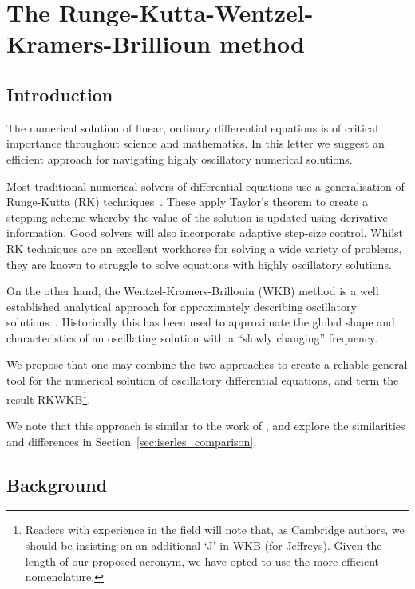 

\chapter{The Runge-Kutta-Wentzel-Kramers-Brillioun method}
\label{chap:RK}

\section{Introduction}
\label{sec:introduction}
The numerical solution of linear, ordinary differential equations is of critical importance throughout science and mathematics. In this letter we suggest an efficient approach for navigating highly oscillatory numerical solutions.

Most traditional numerical solvers of differential equations use a generalisation of Runge-Kutta (RK) techniques~\citep{Press+2007}. These apply Taylor's theorem to create a stepping scheme whereby the value of the solution is updated using derivative information. Good solvers will also incorporate adaptive step-size control.
Whilst RK techniques are an excellent workhorse for solving a wide variety of problems, they are known to struggle to solve equations with highly oscillatory solutions.

On the other hand, the Wentzel-Kramers-Brillouin (WKB) method is a well established analytical approach for approximately describing oscillatory solutions~\citep{RHB,Bender+2010}. Historically this has been used to approximate the global shape and characteristics of an oscillating solution with a ``slowly changing'' frequency.

We propose that one may combine the two approaches to create a reliable general tool for the numerical solution of oscillatory differential equations, and term the result RKWKB\footnote{Readers with experience in the field will note that, as Cambridge authors, we should be insisting on an additional `J' in WKB (for Jeffreys). Given the length of our proposed acronym, we have opted to use the more efficient nomenclature.}.

We note that this approach is similar to the work of \cite{Iserles02globalerror,Iserles01thinkglobally}, and explore the similarities and differences in Section~\ref{sec:iserles_comparison}.


\section{Background}
